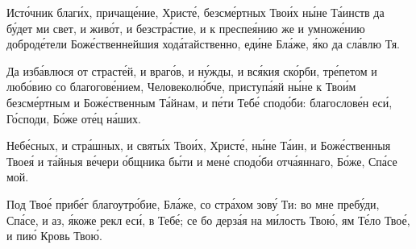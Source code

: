 \begin{mymulticols}

Ист\'{о}чник благ\'{и}х, причащ\'{е}ние, Христ\'{е}, безсм\'{е}ртных Тво\'{и}х н\'{ы}не Т\'{а}инств да б\'{у}дет ми свет, и жив\'{о}т, и безстр\'{а}стие, и к преспе\'{я}нию же и умнож\'{е}нию доброд\'{е}тели Бож\'{е}ственнейшия ход\'{а}тайственно, ед\'{и}не Бл\'{а}же, \'{я}ко да сл\'{а}влю Тя.


Да изб\'{а}влюся от страст\'{е}й, и враг\'{о}в, и н\'{у}жды, и вс\'{я}кия ск\'{о}рби, тр\'{е}петом и люб\'{о}вию со благогов\'{е}нием, Человекол\'{ю}бче, приступ\'{а}яй н\'{ы}не к Тво\'{и}м безсм\'{е}ртным и Бож\'{е}ственным Т\'{а}йнам, и п\'{е}ти Теб\'{е} спод\'{о}би: благослов\'{е}н ес\'{и}, Г\'{о}споди, Б\'{о}же от\'{е}ц н\'{а}ших.






Неб\'{е}сных, и стр\'{а}шных, и свят\'{ы}х Тво\'{и}х, Христ\'{е}, н\'{ы}не Т\'{а}ин, и Бож\'{е}ственныя Твое\'{я} и т\'{а}йныя в\'{е}чери \'{о}бщника б\'{ы}ти и мен\'{е} спод\'{о}би отч\'{а}яннаго, Б\'{о}же, Сп\'{а}се мой.


Под Тво\'{е} приб\'{е}г благоутр\'{о}бие, Бл\'{а}же, со стр\'{а}хом зов\'{у} Ти: во мне преб\'{у}ди, Сп\'{а}се, и аз, \'{я}коже рекл ес\'{и}, в Теб\'{е}; се бо дерз\'{а}я на м\'{и}лость Тво\'{ю}, ям Т\'{е}ло Тво\'{е}, и пи\'{ю} Кровь Тво\'{ю}.



\end{mymulticols}
